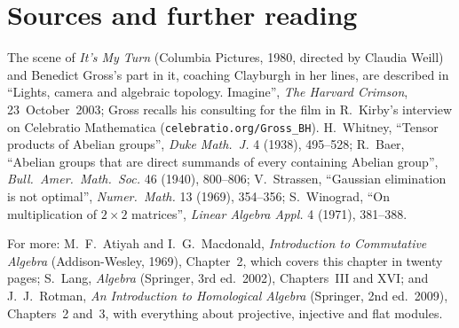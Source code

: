 \section*{Sources and further reading}

The scene of \emph{It's My Turn} (Columbia Pictures, 1980, directed by Claudia Weill) and Benedict Gross's part in it, coaching Clayburgh in her lines, are described in ``Lights, camera and algebraic topology. Imagine'', \emph{The Harvard Crimson}, 23~October~2003; Gross recalls his consulting for the film in R.~Kirby's interview on Celebratio Mathematica (\texttt{celebratio.org/Gross\_BH}).
H.~Whitney, ``Tensor products of Abelian groups'', \emph{Duke Math.\ J.} 4 (1938), 495--528; R.~Baer, ``Abelian groups that are direct summands of every containing Abelian group'', \emph{Bull.\ Amer.\ Math.\ Soc.} 46 (1940),
800--806; V.~Strassen, ``Gaussian elimination is not optimal'', \emph{Numer.\ Math.} 13 (1969), 354--356; S.~Winograd, ``On multiplication of $2\times2$ matrices'', \emph{Linear Algebra Appl.} 4 (1971), 381--388.

For more: M.~F.~Atiyah and I.~G.~Macdonald, \emph{Introduction to Commutative Algebra} (Addison-Wesley, 1969), Chapter~2, which covers this chapter in twenty pages; S.~Lang, \emph{Algebra} (Springer, 3rd ed.\ 2002),
Chapters~III and XVI; and J.~J.~Rotman, \emph{An Introduction to Homological Algebra} (Springer, 2nd ed.\ 2009), Chapters~2 and~3, with everything about projective, injective and flat modules.
